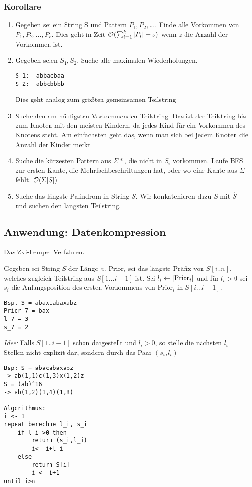         \subsubsection{Korollare}
            \begin{enumerate}
                \item Gegeben sei ein String S und Pattern $P_1,P_2,...$. Finde alle Vorkommen von $P_1,P_2,...,P_k$. Dies geht in Zeit $\mathcal{O}(\sum_{i=1}^{k}{\lvert P_i\rvert+z})$ wenn $z$ die Anzahl der Vorkommen ist.   
                \item Gegeben seien $S_1,S_2$. Suche alle maximalen Wiederholungen.
\begin{verbatim}
S_1:  abbacbaa
S_2:  abbcbbbb
\end{verbatim}
                Dies geht analog zum größten gemeinsamen Teilstring
                \item Suche den am häufigsten Vorkommenden Teilstring. Das ist der Teilstring bis zum Knoten mit den meisten Kindern, da jedes Kind für ein Vorkommen des Knotens steht. Am einfachsten geht das, wenn man sich bei jedem Knoten die Anzahl der Kinder merkt
                \item Suche die kürzesten Pattern aus $\Sigma*$, die nicht in $S_i$ vorkommen. Laufe BFS zur ersten Kante, die Mehrfachbeschriftungen hat, oder wo eine Kante aus $\Sigma$ fehlt. $\mathcal{O}(\Sigma \lvert S\rvert)$
                \item Suche das längste Palindrom in String $S$. Wir konkatenieren dazu $S$ mit $\overline{S}$ und suchen den längsten Teilstring.    
            \end{enumerate}
            
    \subsection{Anwendung: Datenkompression}
        Das Zvi-Lempel Verfahren.
        \begin{definition}
            Gegeben sei String $S$ der Länge $n$. $\text{Prior}_i$ sei das längste Präfix von $S[i..n]$, welches zugleich Teilstring aus $S[1... i-1]$ ist. Sei $l_i \leftarrow \lvert\text{Prior}_i\rvert$ und für $l_i > 0$ sei $s_i$ die Anfangsposition des ersten Vorkommens von $\text{Prior}_i$ in $S[i... i-1]$.
        \end{definition}
\begin{verbatim}
Bsp: S = abaxcabaxabz
Prior_7 = bax
l_7 = 3
s_7 = 2
\end{verbatim}
        \emph{Idee:} Falls $S[1.. i-1]$ schon dargestellt und $l_i > 0$, so stelle die nächsten $l_i$ Stellen nicht explizit dar, sondern durch das Paar $(s_i,l_i)$           
\begin{verbatim}
Bsp: S = abacabaxabz
-> ab(1,1)c(1,3)x(1,2)z
S = (ab)^16
-> ab(1,2)(1,4)(1,8)

Algorithmus:
i <- 1
repeat berechne l_i, s_i
    if l_i >0 then
        return (s_i,l_i)
        i<- i+l_i
    else
        return S[i]
        i <- i+1
until i>n
\end{verbatim}
            